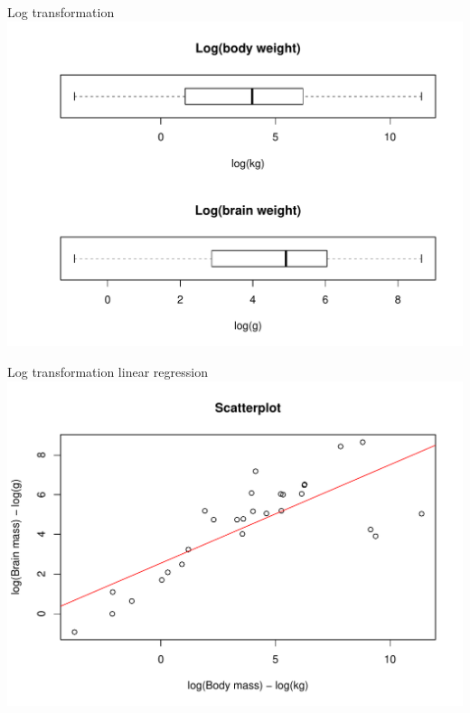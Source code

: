 \documentclass[t,xcolor=pdftex,dvipsnames,table]{beamer}
\makeatletter
\def\maxwidth{ %
  \ifdim\Gin@nat@width>\linewidth
    \linewidth
  \else
    \Gin@nat@width
  \fi
}
\newenvironment{knitrout}{}{} %
\makeatother
\begin{document}
\begin{frame}[fragile]{Log transformation}
\begin{knitrout}
\color{fgcolor}
\includegraphics[width=\maxwidth]{figure/unnamed-chunk-16-1} 

\end{knitrout}
\end{frame}

\begin{frame}[fragile]{Log transformation linear regression}
\begin{knitrout}
\color{fgcolor}
\includegraphics[width=\maxwidth]{figure/unnamed-chunk-17-1} 

\end{knitrout}
\end{frame}
\end{document}
